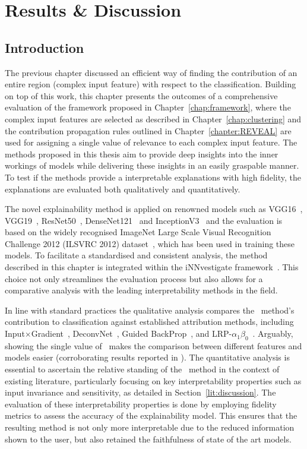 \chapter{Results \& Discussion}
\label{chapter:results}
\section{Introduction}
The previous chapter discussed an efficient way of finding the contribution of an entire region (\ie complex input feature) with respect to the classification. Building on top of this work, this chapter presents the outcomes of a comprehensive evaluation of the framework proposed in Chapter~\ref{chap:framework}, where the complex input features are selected as described in Chapter~\ref{chap:clustering} and the contribution propagation rules outlined in Chapter~\ref{chapter:REVEAL} are used for assigning a single value of relevance to each complex input feature. The methods proposed in this thesis aim to provide deep insights into the inner workings of models while delivering these insights in an easily graspable manner. To test if the methods provide a interpretable explanations with high fidelity, the explanations are evaluated both qualitatively and quantitatively. 

The novel explainability method is applied on renowned models such as VGG16~\cite{SimonyanZ14a}, VGG19~\cite{SimonyanZ14a}, ResNet50~\cite{he2015deep}, DenseNet121~\cite{huang2018densely} and InceptionV3~\cite{szegedy2015rethinking} and the evaluation is based on the widely recognised ImageNet Large Scale Visual Recognition Challenge 2012 (ILSVRC 2012) dataset~\cite{ILSVRC15}, which has been used in training these models. To facilitate a standardised and consistent analysis, the method described in this chapter is integrated within the iNNvestigate framework~\cite{inn}. This choice not only streamlines the evaluation process but also allows for a comparative analysis with the leading interpretability methods in the field.

In line with standard practices the qualitative analysis compares the \CTC\ method's contribution to classification against established attribution methods, including Input$\times$Gradient~\cite{SimonyanVZ13}, DeconvNet~\cite{ZeilerKTF10}, Guided BackProp~\cite{SpringenbergDBR14}, and LRP-$\alpha_1\beta_0$~\cite{bach2015pixel}. Arguably, showing the single value of \CTC\ makes the comparison between different features and models easier (corroborating results reported in \cite{Ribeiro0G16}). The quantitative analysis is essential to ascertain the relative standing of the \CTC\ method in the context of existing literature, particularly focusing on key interpretability properties such as input invariance and sensitivity, as detailed in Section~\ref{lit:discussion}. The evaluation of these interpretability properties is done by employing fidelity metrics to assess the accuracy of the explainability model. This ensures that the resulting method is not only more interpretable due to the reduced information shown to the user, but also retained the faithfulness of state of the art models.



